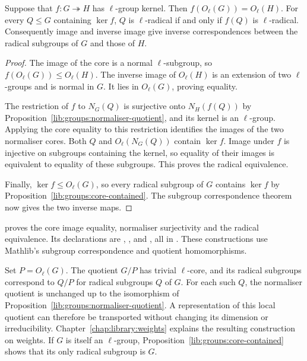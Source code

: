 \begin{proposition}
\label{lib:groups:radical-quotient}
Suppose that $f:G\twoheadrightarrow H$ has $\ell$-group kernel. Then
$f(O_\ell(G))=O_\ell(H)$. For every $Q\leq G$ containing $\ker f$,
$Q$ is $\ell$-radical if and only if $f(Q)$ is $\ell$-radical.
Consequently image and inverse image give inverse correspondences between
the radical subgroups of $G$ and those of $H$.
\end{proposition}
\begin{proof}
The image of the core is a normal $\ell$-subgroup, so
$f(O_\ell(G))\leq O_\ell(H)$. The inverse image of $O_\ell(H)$ is
an extension of two $\ell$-groups and is normal in $G$. It lies in
$O_\ell(G)$, proving equality.

The restriction of $f$ to $N_G(Q)$ is surjective onto $N_H(f(Q))$ by
Proposition~\ref{lib:groups:normaliser-quotient}, and its kernel is an
$\ell$-group. Applying the core equality to this restriction identifies
the images of the two normaliser cores. Both $Q$ and $O_\ell(N_G(Q))$
contain $\ker f$. Image under $f$ is injective on subgroups containing
the kernel, so equality of their images is equivalent to equality of these
subgroups. This proves the radical equivalence.

Finally, $\ker f\leq O_\ell(G)$, so every radical subgroup of $G$
contains $\ker f$ by Proposition~\ref{lib:groups:core-contained}.
The subgroup correspondence theorem now gives the two inverse maps.
\end{proof}
\begin{implementation}
 proves the core image equality,
normaliser surjectivity and the radical equivalence. Its declarations are
,
,
 and
, all in
. These constructions use Mathlib's subgroup
correspondence and quotient homomorphisms.
\end{implementation}

\begin{example}
Set $P=O_\ell(G)$. The quotient $G/P$ has trivial $\ell$-core, and its
radical subgroups correspond to $Q/P$ for radical subgroups $Q$ of $G$.
For each such $Q$, the normaliser quotient is unchanged up to the isomorphism
of Proposition~\ref{lib:groups:normaliser-quotient}. A representation of
this local quotient can therefore be transported without changing its
dimension or irreducibility. Chapter~\ref{chap:library:weights} explains
the resulting construction on weights. If $G$ is itself an $\ell$-group,
Proposition~\ref{lib:groups:core-contained} shows that its only radical
subgroup is $G$.
\end{example}

